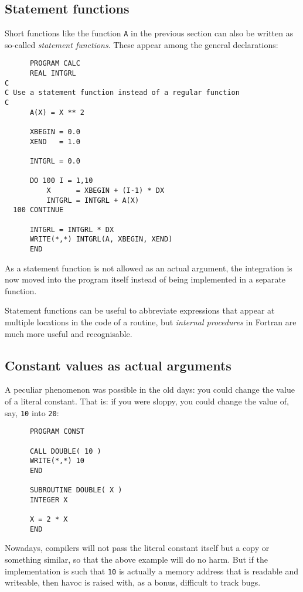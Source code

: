 \subsection{Statement functions}
Short functions like the function \verb+A+ in the previous section can also be
written as so-called \emph{statement functions}. These appear among the general
declarations:
\begin{verbatim}
      PROGRAM CALC
      REAL INTGRL
C
C Use a statement function instead of a regular function
C
      A(X) = X ** 2

      XBEGIN = 0.0
      XEND   = 1.0

      INTGRL = 0.0

      DO 100 I = 1,10
          X      = XBEGIN + (I-1) * DX
          INTGRL = INTGRL + A(X)
  100 CONTINUE

      INTGRL = INTGRL * DX
      WRITE(*,*) INTGRL(A, XBEGIN, XEND)
      END
\end{verbatim}

As a statement function is not allowed as an actual argument, the integration
is now moved into the program itself instead of being implemented in a separate
function.

Statement functions can be useful to abbreviate expressions that appear at
multiple locations in the code of a routine, but \emph{internal procedures}
in Fortran are much more useful and recognisable.


\subsection{Constant values as actual arguments}
A peculiar phenomenon was possible in the old days: you could change the
value of a literal constant. That is: if you were sloppy, you could change the
value of, say, \verb+10+ into \verb+20+:
\begin{verbatim}
      PROGRAM CONST

      CALL DOUBLE( 10 )
      WRITE(*,*) 10
      END

      SUBROUTINE DOUBLE( X )
      INTEGER X

      X = 2 * X
      END
\end{verbatim}

Nowadays, compilers will not pass the literal constant itself but a copy or something similar, so that
the above example will do no harm. But if the implementation is such that \verb+10+
is actually a memory address that is readable and writeable, then havoc is raised with, as
a bonus, difficult to track bugs.


